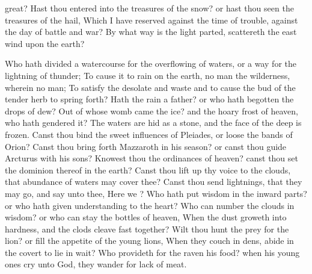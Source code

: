 {{}
great?
Hast thou
entered into the
treasures of the
snow? or hast thou
seen the
treasures of the
hail,
Which I have
reserved against the
time of
trouble, against the
day of
battle and
war?
By
what
way is the
light
parted,
{}
scattereth the east
wind upon the
earth?
\par }{\PP {}Who hath
divided a
watercourse for the overflowing of
waters, or a
way for the
lightning of
thunder;
To cause it to
rain on the
earth,
{} no
man
{} the
wilderness, wherein
{} no
man;
To
satisfy the
desolate and
waste
{} and to cause the
bud of the tender
herb to spring
forth?
Hath the
rain a
father? or who hath
begotten the
drops of
dew?
Out of whose
womb
came the
ice? and the hoary
frost of
heaven, who hath
gendered it?
The
waters are
hid as
{} a
stone, and the
face of the
deep is
frozen.
Canst thou
bind the sweet
influences of
Pleiades, or
loose the
bands of
Orion?
Canst thou bring
forth
Mazzaroth in his
season? or canst thou
guide
Arcturus with his
sons?
Knowest thou the
ordinances of
heaven? canst thou
set the
dominion thereof in the
earth?
Canst thou lift
up thy
voice to the
clouds, that
abundance of
waters may
cover thee?
Canst thou
send
lightnings, that they may
go, and
say unto thee, Here we
{}?
Who hath
put
wisdom in the inward
parts? or who hath
given
understanding to the
heart?
Who can
number the
clouds in
wisdom? or who can
stay the
bottles of
heaven,
When the
dust
groweth into
hardness, and the
clods cleave fast
together?
Wilt thou
hunt the
prey for the
lion? or
fill the
appetite of the young
lions,
When they
couch in
{}
dens,
{}
abide in the
covert
to lie in
wait?
Who
provideth for the
raven his
food? when his young
ones
cry unto
God, they
wander for
lack of
meat.

}
